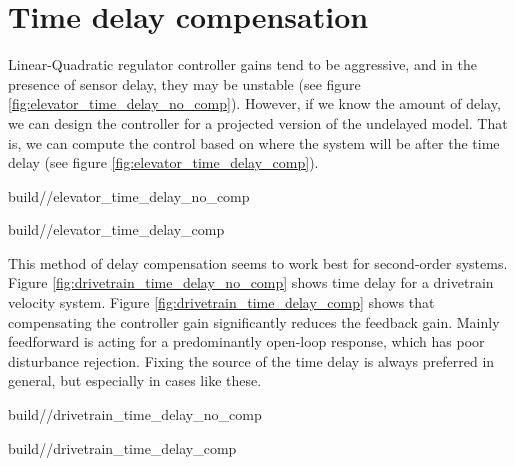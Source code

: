 \section{Time delay compensation}

Linear-Quadratic regulator controller gains tend to be aggressive, and in the
presence of sensor delay, they may be unstable (see figure
\ref{fig:elevator_time_delay_no_comp}). However, if we know the amount of delay,
we can design the controller for a projected version of the undelayed model.
That is, we can compute the control based on where the system will be after the
time delay (see figure \ref{fig:elevator_time_delay_comp}).
\begin{bookfigure}
  \begin{minisvg}{2}{build/\chapterpath/elevator_time_delay_no_comp}
    \caption{Elevator response at 5ms sample period with 50ms of output lag
      (uncompensated controller gains)}
    \label{fig:elevator_time_delay_no_comp}
  \end{minisvg}
  \hfill
  \begin{minisvg}{2}{build/\chapterpath/elevator_time_delay_comp}
    \caption{Elevator response at 5ms sample period with 50ms of output lag
      (compensated controller gains)}
    \label{fig:elevator_time_delay_comp}
  \end{minisvg}
\end{bookfigure}

This method of delay compensation seems to work best for second-order systems.
Figure \ref{fig:drivetrain_time_delay_no_comp} shows time delay for a drivetrain
velocity system. Figure \ref{fig:drivetrain_time_delay_comp} shows that
compensating the controller gain significantly reduces the feedback gain. Mainly
feedforward is acting for a predominantly open-loop response, which has poor
disturbance rejection. Fixing the source of the time delay is always preferred
in general, but especially in cases like these.
\begin{bookfigure}
  \begin{minisvg}{2}{build/\chapterpath/drivetrain_time_delay_no_comp}
    \caption{Drivetrain response at 1ms sample period with 40ms of output lag
      (uncompensated controller gain)}
    \label{fig:drivetrain_time_delay_no_comp}
  \end{minisvg}
  \hfill
  \begin{minisvg}{2}{build/\chapterpath/drivetrain_time_delay_comp}
    \caption{Drivetrain response at 1ms sample period with 40ms of output lag
      (compensated controller gain)}
    \label{fig:drivetrain_time_delay_comp}
  \end{minisvg}
\end{bookfigure}

